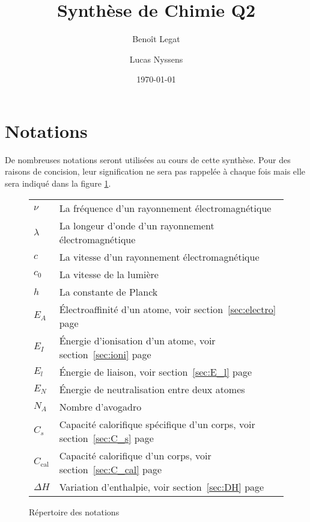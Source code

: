 \documentclass[11pt,a4paper,french]{article}
\title{Synthèse de Chimie Q2}
\author{Benoît Legat \and Lucas Nyssens}
\date{\today}
\begin{document}
\newcommand\sorb{\mathrm{s}}
\newcommand\porb{\mathrm{p}}
\newcommand\dorb{\mathrm{d}}
\newcommand\gaz{_{(g)}}
\newcommand\solid{_{(s)}}
\newcommand\liquid{_{(l)}}
\newcommand\debye{\mathrm{D}}
\newcommand\calo{\mathrm{cal}}
\newcommand\atm{\mathrm{atm}}
\newcommand\ccal{C_\mathrm{cal}}

\maketitle

\section{Notations}

De nombreuses notations seront utilisées au cours de cette synthèse.
Pour des raisons de concision, leur signification ne sera pas rappelée à chaque fois mais elle sera indiqué dans la figure \ref{fig:notations}.
\begin{figure}[h!]
	\begin{center}
		\begin{tabular}{ll}
			$\nu$ & La fréquence d'un rayonnement électromagnétique\\
			$\lambda$ & La longeur d'onde d'un rayonnement électromagnétique\\
			$c$ & La vitesse d'un rayonnement électromagnétique\\
			$c_0$ & La vitesse de la lumière\\
			$h$ & La constante de Planck\\
			$E_A$ & \'Electroaffinité d'un atome, voir section~\ref{sec:electro} page~\pageref{sec:electro}\\
			$E_I$ & \'Energie d'ionisation d'un atome, voir section~\ref{sec:ioni} page~\pageref{sec:ioni}\\
			$E_l$ & \'Energie de liaison, voir section~\ref{sec:E_l} page~\pageref{sec:E_l}\\ %
			$E_N$ & \'Energie de neutralisation entre deux atomes\\
			$N_A$ & Nombre d'avogadro\\
			$C_s$ & Capacité calorifique spécifique d'un corps, voir section~\ref{sec:C_s} page~\pageref{sec:C_s}\\
			$\ccal$ & Capacité calorifique d'un corps, voir section~\ref{sec:C_cal} page~\pageref{sec:C_cal}\\
			$\Delta H$ & Variation d'enthalpie, voir section~\ref{sec:DH} page~\pageref{sec:DH}
		\end{tabular}
		\label{fig:notations}
		\caption{Répertoire des notations}
	\end{center}
\end{figure}
\end{document}
